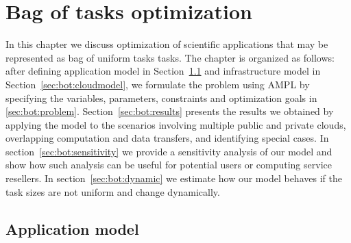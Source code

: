 { %

\newcommand{\INSTANCE}{I}
\newcommand{\STORAGE}{S}
\newcommand{\PROVIDER}{P}
\newcommand{\PROVIDERINSTANCES}{PI}
\newcommand{\LOCALSTORAGE}{LS}

\newcommand{\instancePrice}{p^I}
\newcommand{\ccu}{ccu}
\newcommand{\instanceTransferPriceIn}{p^{Iin}}
\newcommand{\instanceTransferPriceOut}{p^{Iout}}
\newcommand{\storageTransferPriceOut}{p^{Sout}}
\newcommand{\storageTransferPriceIn}{p^{Sin}}
\newcommand{\transferRate}{r}
\newcommand{\totalTasks}{A^{tot}}
\newcommand{\transferTime}{t^{net}}
\newcommand{\execTime}{t^x}
\newcommand{\dataSizeIn}{d^{in}}
\newcommand{\dataSizeOut}{d^{out}}
\newcommand{\requestPrice}{p^{R}}
\newcommand{\deadline}{t^D}
\newcommand{\instanceDeadline}{t^d}
\newcommand{\unitTime}{t^u}
\newcommand{\transferCost}{c^t}
\newcommand{\tasksPerDeadline}{a^d}
\newcommand{\timeQuantum}{t^q}
\newcommand{\tasksPerTimeQuantum}{a^q}
\newcommand{\providerMaxMachines}{n^{Pmax}}
\newcommand{\instanceMaxMachines}{n^{Imax}}

\newcommand{\NumberInstances}{N}
\newcommand{\TaskAssignment}{A}
\newcommand{\DataAssignment}{D}
\newcommand{\TailTaskHours}{R}
\newcommand{\HasTail}{H}

\chapter{Bag of tasks optimization}
\label{chap:bot} 

   In this chapter we discuss optimization of scientific applications that may be represented as bag of uniform tasks tasks. The chapter is organized as follows: after defining application model in Section~\ref{sec:bot:appmodel} and infrastructure model in Section~\ref{sec:bot:cloudmodel}, we formulate the problem using AMPL by specifying the variables, parameters, constraints and optimization goals in \ref{sec:bot:problem}. Section~\ref{sec:bot:results} presents the results we obtained by applying the model to the scenarios involving multiple public and private clouds, overlapping computation and data transfers, and identifying special cases. In section~\ref{sec:bot:sensitivity} we provide a sensitivity analysis of our model and show how such analysis can be useful for potential users or computing service resellers. In section~\ref{sec:bot:dynamic} we estimate how our model behaves if the task sizes are not uniform and change dynamically.

\section{Application model}
\label{sec:bot:appmodel}

}
